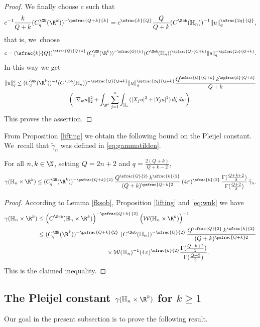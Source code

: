 \begin{proof}
We finally choose $c$ such that
\[
c^{-1} \frac{k}{Q+k} (C^\GN_{q}(\R^k))^{-\psfrac{Q+k}{k}} = c^{\sfrac{k}{Q}} \frac{Q}{Q+k} (C^\Sob(\mathbb H_n))^{-1} \| u \|_q^{\sfrac{2q}{Q}},
\]
that is, we~choose
\[
c = \left(\sfrac{k}{Q}\right)^{\sfrac{Q}{Q+k}} (C^\GN_{q}(\R^k))^{-\sfrac{Q}{k}} (C^\Sob(\mathbb H_n))^{\spfrac{Q}{Q+k}} \| u \|_q^{-\spfrac{2q}{Q+k}}.
\]
In this way we get
\begin{multline*}
\| u \|_q^q \leq (C^\GN_{q}(\R^k))^{-1} (C^\Sob(\mathbb H_n))^{-\spfrac{Q}{Q+k}} \| u \|_q^{\spfrac{2q}{Q+k}}
\frac{Q^{\sfrac{Q}{Q+k}}\,k^{\spfrac{k}{Q+k}}}{Q+k}\\
\biggl(\| \nabla_w u\|_2^2
+ \int_{\R^k} \sum_{j=1}^n \int_{\mathbb H_n} (|X_ju|^2 + |Y_ju|^2)\,d\zeta \,dw\biggr).
\end{multline*}
This proves the assertion.
\end{proof}

From Proposition \ref{lifting} we obtain the following bound on the Pleijel constant. We~recall that $\tilde\gamma_n$ was defined in \eqref{eq:gammatilden}.

\begin{corollary}\label{pleijellifting}
For all $n,k\in\N$, setting $Q= 2n+2$ and $q=\frac{2(Q+k)}{Q+k-2}$,
\[
\gamma(\mathbb H_n\times\R^k) \leq
(C^\GN_{q}(\R^k))^{-\psfrac{Q+k}{2}} \,\frac{Q^{\sfrac{Q}{2}} \,k^{\sfrac{k}{2}}}{(Q+k)^{\psfrac{Q+k}2}} \,
(4\pi)^{\sfrac{k}{2}} \,\frac{\Gamma(\frac{Q+k+2}{2})}{\Gamma(\frac{Q+2}2)} \,\tilde\gamma_n.
\]
\end{corollary}

\begin{proof}
According to Lemma \ref{fksob}, Proposition \ref{lifting} and \eqref{eq:wnk} we have
\begin{align*}
\gamma(\mathbb H_n\times\R^k) & \leq \left(C^\Sob(\mathbb H_n\times\R^k)\right)^{-\psfrac{Q+k}{2}} \left(\mathcal W(\mathbb H_n \times\R^k)\right)^{-1} \\
& \leq (C^\GN_{q}(\R^k))^{-\psfrac{Q+k}{2}} \ (C^\Sob(\mathbb H_n))^{-\sfrac{Q}{2}} \,\frac{Q^{\sfrac{Q}{2}} \,k^{\sfrac{k}{2}}}{(Q+k)^{\psfrac{Q+k}2}} \\
& \hspace*{4cm} \times
\mathcal W(\mathbb H_n)^{-1} (4\pi)^{\sfrac{k}{2}} \frac{\Gamma(\frac{Q+k+2}{2})}{\Gamma(\frac{Q+2}2)}.
\end{align*}
This is the claimed inequality.
\end{proof}

\subsection{The Pleijel constant $\gamma(\mathbb H_n\times\R^k)$ for $k\geq 1$} \label{sec:maincompk}
Our goal in the present subsection is to prove the following result.

